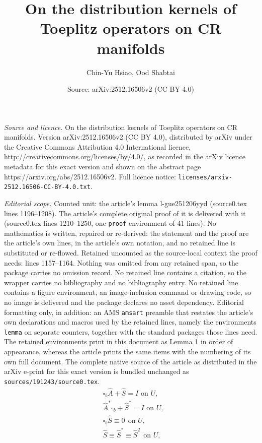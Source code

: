 \documentclass[10pt,a4paper]{amsart}
\title{On the distribution kernels of Toeplitz operators on CR manifolds}
\author{Chin-Yu Hsiao, Ood Shabtai}
\date{Source: arXiv:2512.16506v2 (CC BY 4.0)}
\begin{document}
\maketitle

\noindent\emph{Source and licence.} On the distribution kernels of Toeplitz operators on CR manifolds. Version arXiv:2512.16506v2 (CC BY 4.0), distributed by arXiv under the Creative Commons Attribution 4.0 International licence, http://creativecommons.org/licenses/by/4.0/, as recorded in the arXiv licence metadata for this exact version and shown on the abstract page https://arxiv.org/abs/2512.16506v2. Full licence notice: \texttt{licenses/arxiv-2512.16506-CC-BY-4.0.txt}.\par\smallskip

\noindent\textit{Editorial scope.} Counted unit: the article's lemma l-gue251206yyd (source0.tex lines 1196--1208). The article's complete original proof of it is delivered with it (source0.tex lines 1210--1250, one \texttt{proof} environment of 41 lines). No mathematics is written, repaired or re-derived: the statement and the proof are the article's own lines, in the article's own notation, and no retained line is substituted or re-flowed.  Retained uncounted as the source-local context the proof needs: lines 1157--1164.  Nothing was omitted from any retained span, so the package carries no omission record.  No retained line contains a citation, so the wrapper carries no bibliography and no bibliography entry.  No retained line contains a figure environment, an image-inclusion command or drawing code, so no image is delivered and the package declares no asset dependency.  Editorial formatting only, in addition: an AMS \texttt{amsart} preamble that restates the article's own declarations and macros used by the retained lines, namely the environments \texttt{lemma} on separate counters, together with the standard packages those lines need.  The retained environments print in this document as Lemma 1 in order of appearance, whereas the article prints the same items with the numbering of its own full document.  The complete native source of the article as distributed in the arXiv e-print for this exact version is bundled unchanged as \texttt{sources/191243/source0.tex}.
 \begin{equation}\label{e-gue251206yyd}
			\begin{split}
				&\mbox{$\square_b\hat{A}+\hat{S}=I$ on $U$},\\
                &\mbox{$\hat{A}^*\square_b+\hat{S}^*=I$ on $U$},\\
				&\square_b\hat{S}\equiv0\ \ \mbox{on $U$},\\
				&\hat{S}\equiv \hat{S}^*\equiv \hat{S}^2\ \ \mbox{on $U$},
			\end{split}
		\end{equation}
\end{document}
